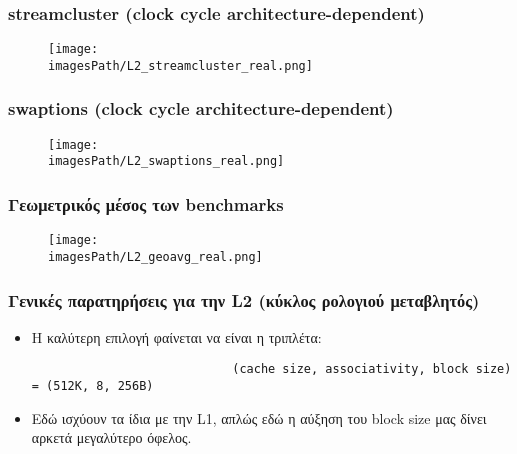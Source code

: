 \documentclass[12pt,a4paper]{article}
\newcommand{\imagesPath}{parsec-3.0/parsec_workspace/graphs}
\begin{document}
			\subsubsection{streamcluster (clock cycle architecture-dependent)}
				\begin{figure}[H]
					\begin{center}
						\texttt{[image: \\imagesPath/L2\_streamcluster\_real.png]}
					\end{center}
				\end{figure}
						
			\subsubsection{swaptions (clock cycle architecture-dependent)}
				\begin{figure}[H]
					\begin{center}
						\texttt{[image: \\imagesPath/L2\_swaptions\_real.png]}
					\end{center}
				\end{figure}
						
			\subsubsection{Γεωμετρικός μέσος των benchmarks}
				\begin{figure}[H]
					\begin{center}
						\texttt{[image: \\imagesPath/L2\_geoavg\_real.png]}
					\end{center}
				\end{figure}
					
			\subsubsection{Γενικές παρατηρήσεις για την L2 (κύκλος ρολογιού μεταβλητός)}
				\begin{itemize}
					\item Η καλύτερη επιλογή φαίνεται να είναι η τριπλέτα:
					
						\begin{verbatim}
							(cache size, associativity, block size) = (512K, 8, 256B)
						\end{verbatim}
					\item Εδώ ισχύουν τα ίδια με την L1, απλώς εδώ η αύξηση του block size μας δίνει αρκετά μεγαλύτερο όφελος.
			\end{itemize}
		
\end{document}
